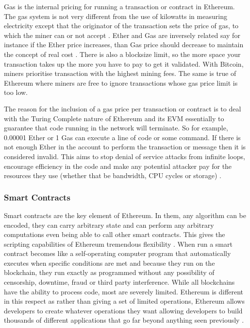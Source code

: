 \documentclass{article}
\begin{document}
Gas is the internal pricing for running a transaction or contract in Ethereum. The gas system is not very different from the use of kilowatts in measuring electricity except that the originator of the transaction sets the price of gas, to which the miner can or not accept \citep{56_ethereum_2017}. Ether and Gas are inversely related say for instance if the Ether price increases, than Gas price should decrease to maintain the concept of real cost \citep{54_ethereum_explained_2017}. There is also a blocksize limit, so the more space your transaction takes up the more you have to pay to get it validated. With Bitcoin, miners prioritise transaction with the highest mining fees. The same is true of Ethereum where miners are free to ignore transactions whose gas price limit is too low. 

The reason for the inclusion of a gas price per transaction or contract is to deal with the Turing Complete nature of Ethereum and its EVM essentially to guarantee that code running in the network will terminate. So for example, 0.00001 Ether or 1 Gas can execute a line of code or some command. If there is not enough Ether in the account to perform the transaction or message then it is considered invalid. This aims to stop denial of service attacks from infinite loops, encourage efficiency in the code and make any potential attacker pay for the resources they use (whether that be bandwidth, CPU cycles or storage) \citep{56_ethereum_2017}.

\subsubsection{Smart Contracts}
\label{sec:SmartContracts}
Smart contracts are the key element of Ethereum. In them, any algorithm can be encoded, they can carry arbitrary state and can perform any arbitrary computations even being able to call other smart contracts. This gives the scripting capabilities of Ethereum tremendous flexibility \citep{59_peyrott_senanayaka_2017}. When run a smart contract becomes like a self-operating computer program that automatically executes when specific conditions are met and because they run on the blockchain, they run exactly as programmed without any possibility of censorship, downtime, fraud or third party interference. While all blockchains have the ability to process code, most are severely limited. Ethereum is different in this respect as rather than giving a set of limited operations, Ethereum allows developers to create whatever operations they want allowing developers to build thousands of different applications that go far beyond anything seen previously \citep{55_what_is_ethereum_a_step-by-step_beginners_guide_2017}.
\end{document}
